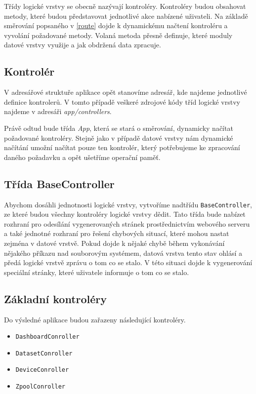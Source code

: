 Třídy logické vrstvy se obecně nazývají kontroléry. Kontroléry budou obsahovat metody, které budou představovat jednotlivé akce nabízené uživateli. Na základě směrování popsaného v \ref{route} dojde k dynamickému načtení kontroléru a vyvolání požadované metody. Volaná metoda přesně definuje, které moduly datové vrstvy využije a jak obdržená data zpracuje.
    \subsection{Kontrolér}
    V adresářové struktuře aplikace opět stanovíme adresář, kde najdeme jednotlivé definice kontrolerů. V tomto případě veškeré zdrojové kódy tříd logické vrstvy najdeme v adresáři \emph{app/controllers}.
    \begin{figure}
      \centering
    \end{figure}

    Právě odtud bude třída \emph{App}, která se stará o směrování, dynamicky načítat požadované kontroléry. Stejně jako v případě datové vrstvy nám dynamické načítání umožní načítat pouze ten kontrolér, který potřebujeme ke zpracování daného požadavku a opět ušetříme operační paměť.

    \subsection{Třída BaseController}
    Abychom dosáhli jednotnosti logické vrstvy, vytvoříme nadtřídu \verb|BaseController|, ze které budou všechny kontroléry logické vrstvy dědit. Tato třída bude nabízet rozhraní pro odesílání vygenerovaných stránek prostřednictvím webového serveru a také jednotné rozhraní pro řešení chybových situací, které mohou nastat zejména v datové vrstvě. Pokud dojde k nějaké chybě během vykonávání nějakého příkazu nad souborovým systémem, datová vrstva tento stav ohlásí a předá logické vrstvě zprávu o tom co se stalo. V této situaci dojde k vygenerování speciální stránky, které uživatele informuje o tom co se stalo.
    \subsection{Základní kontroléry}
    Do výsledné aplikace budou zařazeny následující kontroléry.
    \begin{itemize}
      \item \verb|DashboardConroller|
      \item \verb|DatasetConroller|
      \item \verb|DeviceConroller|
      \item \verb|ZpoolConroller|
    \end{itemize}


